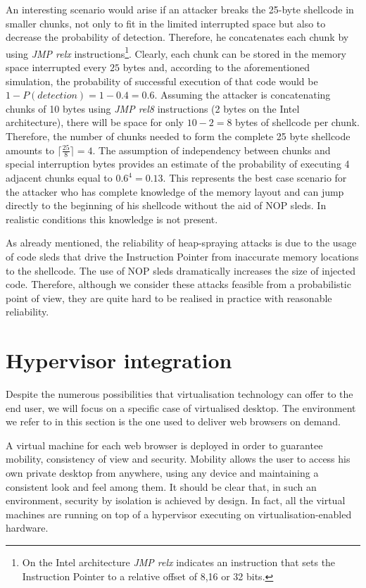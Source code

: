 An interesting scenario would arise if an attacker breaks the 25-byte shellcode in smaller chunks, not only to fit in the limited interrupted space but also to decrease the probability of detection. Therefore, he concatenates each chunk by using \emph{JMP relx} instructions\footnote{On the Intel architecture \emph{JMP relx} indicates an instruction that sets the Instruction Pointer to a relative offset of 8,16 or 32 bits.}. 
Clearly, each chunk can be stored in the memory space interrupted every $25$ bytes and, according to the aforementioned simulation, the probability of successful execution of that code would be $1 - P(detection) = 1 - 0.4 = 0.6$. 
Assuming the attacker is concatenating chunks of 10 bytes using \emph{JMP rel8} instructions (2 bytes on the Intel architecture), there will be space for only $10-2 = 8$ bytes of shellcode per chunk. Therefore, the number of chunks needed to form the complete 25 byte shellcode amounts to $\lceil \frac{25}{8} \rceil = 4$. 
The assumption of independency between chunks and special interruption bytes provides an estimate of the probability of executing 4 adjacent chunks equal to $0.6^4 = 0.13$.  This represents the best case scenario for the attacker who has complete knowledge of the memory layout and can jump directly to the beginning of his shellcode without the aid of NOP sleds. In realistic conditions this knowledge is not present.

As already mentioned, the reliability of heap-spraying attacks is due to the usage of code sleds that drive the Instruction Pointer from inaccurate memory locations to the shellcode. The use of NOP sleds dramatically increases the size of injected code. Therefore, although we consider these attacks feasible from a probabilistic point of view, they are quite hard to be realised in practice with reasonable reliability.



\section{Hypervisor integration}\label{bub:integration}
Despite the numerous possibilities that virtualisation technology can offer to the end user, we will focus on a specific case of virtualised desktop. The environment we refer to in this section is the one used to deliver web browsers on demand. 

A virtual machine for each web browser is deployed in order to guarantee mobility, consistency of view and security. Mobility allows the user to access his own private desktop from anywhere, using any device and maintaining a consistent look and feel among them. It should be clear that, in such an environment, security by isolation is achieved by design. In fact, all the virtual machines are running on top of a hypervisor executing on virtualisation-enabled hardware.

